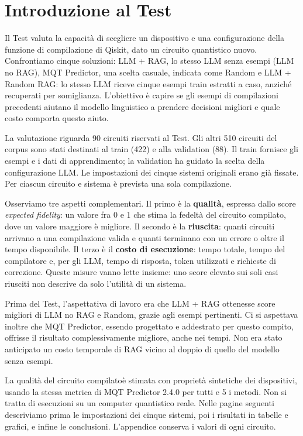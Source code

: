 \providecommand{\TestReportPath}{../}
\section{Introduzione al Test}
Il Test valuta la capacità di scegliere un dispositivo e una configurazione della funzione di compilazione
di Qiskit, dato un circuito quantistico nuovo. Confrontiamo cinque soluzioni: LLM + RAG, lo stesso LLM senza
esempi (LLM no RAG), MQT Predictor, una scelta casuale, indicata come Random e LLM + Random RAG: lo stesso LLM riceve
cinque esempi train estratti a caso, anziché recuperati per somiglianza.
L'obiettivo è capire se gli esempi di compilazioni precedenti aiutano il modello
linguistico a prendere decisioni migliori e quale costo comporta questo aiuto.

La valutazione riguarda 90 circuiti riservati al Test. Gli altri 510 circuiti
del corpus sono stati destinati al train (422) e alla validation (88).
Il train fornisce gli esempi e i dati di apprendimento; la validation ha guidato
la scelta della configurazione LLM. Le impostazioni dei cinque sistemi originali erano già fissate.
Per ciascun circuito e sistema è prevista una sola compilazione.

Osserviamo tre aspetti complementari. Il primo è la \textbf{qualità}, espressa
dallo score \emph{expected fidelity}: un valore fra 0 e 1 che stima la fedeltà
del circuito compilato, dove un valore maggiore è migliore. Il secondo è la
\textbf{riuscita}: quanti circuiti arrivano a una compilazione valida e quanti
terminano con un errore o oltre il tempo disponibile. Il terzo è il
\textbf{costo di esecuzione}: tempo totale, tempo del compilatore e, per gli
LLM, tempo di risposta, token utilizzati e richieste di correzione.
Queste misure vanno lette insieme: uno score elevato sui soli casi riusciti
non descrive da solo l'utilità di un sistema.

Prima del Test, l'aspettativa di lavoro era che LLM + RAG ottenesse score
migliori di LLM no RAG e Random, grazie agli esempi pertinenti. Ci si aspettava
inoltre che MQT Predictor, essendo progettato e addestrato per questo compito,
offrisse il risultato complessivamente migliore, anche nei tempi.
Non era stato anticipato un costo temporale di RAG vicino al doppio di quello
del modello senza esempi.

La qualità del circuito compilatoè stimata con proprietà sintetiche dei dispositivi, usando la stessa
metrica di MQT Predictor 2.4.0 per tutti e 5 i metodi. Non si tratta di esecuzioni
su un computer quantistico reale. Nelle pagine seguenti descriviamo prima
le impostazioni dei cinque sistemi, poi i risultati in tabelle e grafici,
e infine le conclusioni. L'appendice conserva i valori di ogni circuito.

